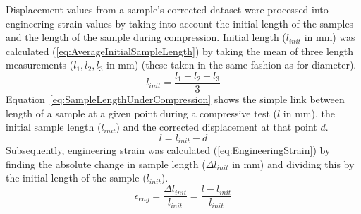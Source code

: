 Displacement values from a sample's corrected dataset were processed into
 engineering strain values by taking into account the initial length of the
 samples and the length of the sample during compression.
Initial length (\(l_{init}\) in \unit{\milli\metre}) was calculated
 (\ref{eq:AverageInitialSampleLength}) by taking the mean of three length
 measurements (\(l_{1},l_{2},l_{3}\) in \unit{\milli\metre}) (these taken in
 the same fashion as for diameter).
 \begin{equation}\label{eq:AverageInitialSampleLength}
    l_{init} = \frac{l_{1}+l_{2}+l_{3}}{3}
\end{equation}
Equation~\ref{eq:SampleLengthUnderCompression} shows the simple link between
 length of a sample at a given point during a compressive test (\(l\) in
 \unit{\milli\metre}), the initial sample length (\(l_{init}\)) and the
 corrected displacement at that point \(d\).
\begin{equation}\label{eq:SampleLengthUnderCompression}
    l = l_{init}-d
\end{equation}
Subsequently, engineering strain was calculated (\ref{eq:EngineeringStrain})
 by finding the absolute change in sample length (\(\Delta l_{init}\) in 
 \unit{\milli\metre}) and dividing this by the initial length of the
 sample (\(l_{init}\)).
\begin{equation}\label{eq:EngineeringStrain}
    \epsilon _{eng}=\frac{\Delta l_{init}}{l_{init}}=\frac{l-l_{init}}{l_{init}}
\end{equation}


